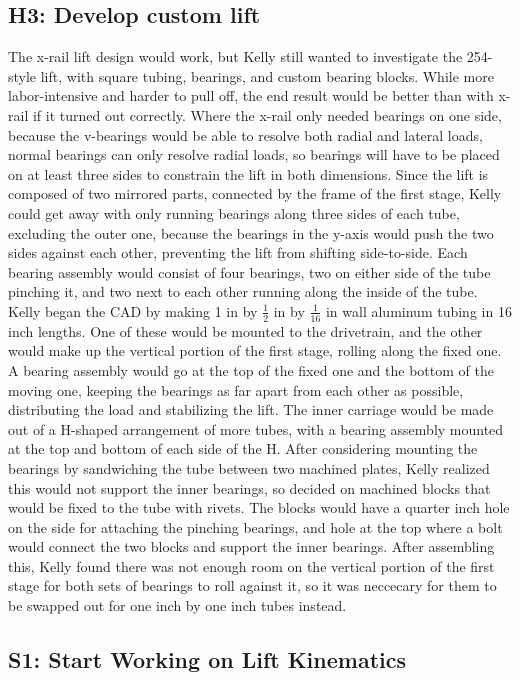 \documentclass{article}
\begin{document}
\subsection{H3: Develop custom lift}

The x-rail lift design would work, but Kelly still wanted to investigate the 254-style lift, with square tubing, bearings, and custom bearing blocks. While more labor-intensive and harder to pull off, the end result would be better than with x-rail if it turned out correctly. Where the x-rail only needed bearings on one side, because the v-bearings would be able to resolve both radial and lateral loads, normal bearings can only resolve radial loads, so bearings will have to be placed on at least three sides to constrain the lift in both dimensions. Since the lift is composed of two mirrored parts, connected by the frame of the first stage, Kelly could get away with only running bearings along three sides of each tube, excluding the outer one, because the bearings in the y-axis would push the two sides against each other, preventing the lift from shifting side-to-side. Each bearing assembly would consist of four bearings, two on either side of the tube pinching it, and two next to each other running along the inside of the tube. Kelly began the CAD by making 1 in by $\frac{1}{2}$ in by $\frac{1}{16}$ in wall aluminum tubing in 16 inch lengths. One of these would be mounted to the drivetrain, and the other would make up the vertical portion of the first stage, rolling along the fixed one. A bearing assembly would go at the top of the fixed one and the bottom of the moving one, keeping the bearings as far apart from each other as possible, distributing the load and stabilizing the lift. The inner carriage would be made out of a H-shaped arrangement of more tubes, with a bearing assembly mounted at the top and bottom of each side of the H. After considering mounting the bearings by sandwiching the tube between two machined plates, Kelly realized this would not support the inner bearings, so decided on machined blocks that would be fixed to the tube with rivets. The blocks would have a quarter inch hole on the side for attaching the pinching bearings, and hole at the top where a bolt would connect the two blocks and support the inner bearings. After assembling this, Kelly found there was not enough room on the vertical portion of the first stage for both sets of bearings to roll against it, so it was neccecary for them to be swapped out for one inch by one inch tubes instead. 
\subsection{S1: Start Working on Lift Kinematics}
\end{document}
